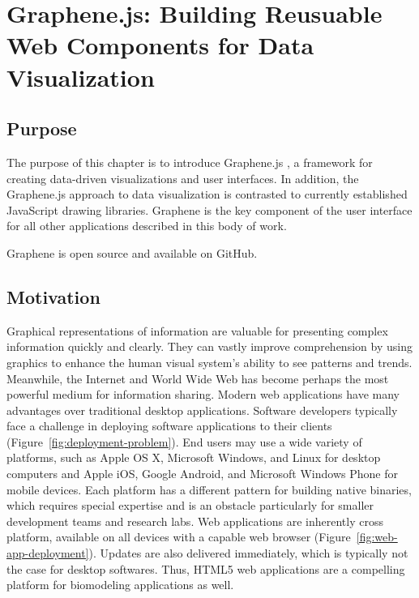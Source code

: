 \chapter{Graphene.js: Building Reusuable Web Components for Data Visualization}
\label{chap:graphene}

\section{Purpose}

The purpose of this chapter is to introduce Graphene.js \autocite{gu2014graphene}, a framework for creating data-driven visualizations and user interfaces.
In addition, the Graphene.js approach to data visualization is contrasted to currently established JavaScript drawing libraries.
Graphene is the key component of the user interface for all other applications described in this body of work.

Graphene is open source and available on GitHub.

\section{Motivation}

Graphical representations of information are valuable for presenting complex information quickly and clearly. \autocite{newsom2007public, smiciklas2012power}
They can vastly improve comprehension by using graphics to enhance the human visual system’s ability to see patterns and trends. \autocite{heer2010tour, sears2007human}
Meanwhile, the Internet and World Wide Web \autocite{berners2000weaving} has become perhaps the most powerful medium for information sharing. \autocite{bollacker1998citeseer, wilkinson2003motivations, page1999pagerank}
Modern web applications have many advantages over traditional desktop applications.
Software developers typically face a challenge in deploying software applications to their clients (Figure~\ref{fig:deployment-problem}).
End users may use a wide variety of platforms, such as Apple OS X, Microsoft Windows, and Linux for desktop computers and Apple iOS, Google Android, and Microsoft Windows Phone for mobile devices.
Each platform has a different pattern for building native binaries, which requires special expertise and is an obstacle particularly for smaller development teams and research labs.
Web applications are inherently cross platform, available on all devices with a capable web browser (Figure~\ref{fig:web-app-deployment}).
Updates are also delivered immediately, which is typically not the case for desktop softwares.
Thus, HTML5 web applications are a compelling platform for biomodeling applications as well.

